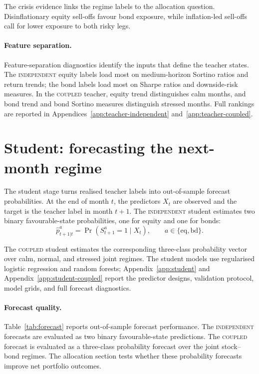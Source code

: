 ﻿\documentclass[10pt]{article}
\newcommand{\Acoup}{\textsc{coupled}}
\newcommand{\Bindep}{\textsc{independent}}
\begin{document}
The crisis evidence links the regime labels to the allocation question. Disinflationary
equity sell-offs favour bond exposure, while inflation-led sell-offs call for lower exposure
to both risky legs.

\paragraph{Feature separation.}
Feature-separation diagnostics identify the inputs that define the teacher states. The
\Bindep{} equity labels load most on medium-horizon Sortino ratios and return trends; the
bond labels load most on Sharpe ratios and downside-risk measures. In the \Acoup{} teacher,
equity trend distinguishes calm months, and bond trend and bond Sortino measures distinguish
stressed months. Full rankings are reported in Appendices~\ref{app:teacher-independent}
and~\ref{app:teacher-coupled}.


\section{Student: forecasting the next-month regime}
\label{sec:student}

The student stage turns realised teacher labels into out-of-sample forecast probabilities.
At the end of month \(t\), the predictors \(X_t\) are observed and the target is the teacher
label in month \(t+1\). The \Bindep{} student estimates two binary favourable-state
probabilities, one for equity and one for bonds:
\begin{equation}
    \hat p^a_{t+1|t}
    =
    \Pr\!\left(S^a_{t+1}=1\mid X_t\right),
    \qquad a\in\{\mathrm{eq},\mathrm{bd}\}.
    \label{eq:independent-student-probability}
\end{equation}

The \Acoup{} student estimates the corresponding three-class probability vector over calm,
normal, and stressed joint regimes. The student models use regularised logistic regression
and random forests; Appendix~\ref{app:student} and Appendix~\ref{app:student-coupled}
report the predictor designs, validation protocol, model grids, and full forecast
diagnostics.

\paragraph{Forecast quality.}
Table~\ref{tab:forecast} reports out-of-sample forecast performance. The \Bindep{} forecasts
are evaluated as two binary favourable-state predictions. The \Acoup{} forecast is evaluated
as a three-class probability forecast over the joint stock--bond regimes. The allocation
section tests whether these probability forecasts improve net portfolio outcomes.
\end{document}
